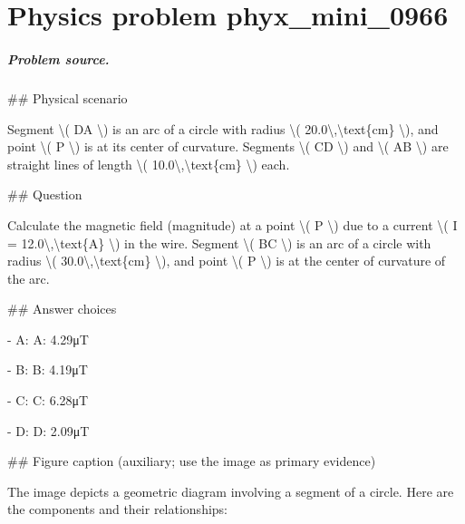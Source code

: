 
\chapter{Physics problem phyx\_mini\_0966}
\label{ch:PhyXMiniProblems_problem_phyx_mini_0966}

\paragraph{Problem source.}
\#\# Physical scenario

Segment \textbackslash{}( DA \textbackslash{}) is an arc of a circle with radius \textbackslash{}( 20.0\textbackslash{},\textbackslash{}text\{cm\} \textbackslash{}), and point \textbackslash{}( P \textbackslash{}) is at its center of curvature. Segments \textbackslash{}( CD \textbackslash{}) and \textbackslash{}( AB \textbackslash{}) are straight lines of length \textbackslash{}( 10.0\textbackslash{},\textbackslash{}text\{cm\} \textbackslash{}) each.

\#\# Question

Calculate the magnetic field (magnitude) at a point \textbackslash{}( P \textbackslash{}) due to a current \textbackslash{}( I = 12.0\textbackslash{},\textbackslash{}text\{A\} \textbackslash{}) in the wire. Segment \textbackslash{}( BC \textbackslash{}) is an arc of a circle with radius \textbackslash{}( 30.0\textbackslash{},\textbackslash{}text\{cm\} \textbackslash{}), and point \textbackslash{}( P \textbackslash{}) is at the center of curvature of the arc.

\#\# Answer choices

- A: A: 4.29μT

- B: B: 4.19μT

- C: C: 6.28μT

- D: D: 2.09μT

\#\# Figure caption (auxiliary; use the image as primary evidence)

The image depicts a geometric diagram involving a segment of a circle. Here are the components and their relationships:

